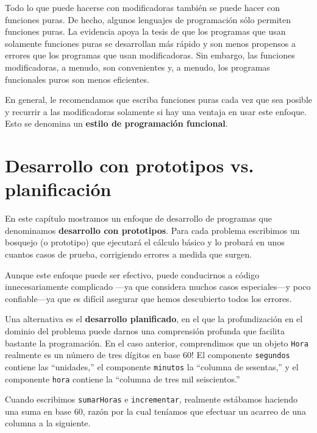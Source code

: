 
Todo lo que puede hacerse con modificadoras también se puede hacer
con funciones puras. De hecho, algunos lenguajes de programación sólo
permiten funciones puras. La evidencia apoya la tesis de que los programas
que usan solamente funciones puras se desarrollan más rápido y son
menos propensos a errores que los programas que usan modificadoras.
Sin embargo, las funciones modificadoras, a menudo, son convenientes
y, a menudo, los programas funcionales puros son menos eficientes.

En general, le recomendamos que escriba funciones puras cada vez que
sea posible y recurrir a las modificadoras solamente si hay una ventaja
en usar este enfoque. Esto se denomina un \textbf{estilo de programación
funcional}.

\section{Desarrollo con prototipos vs. planificación}

\label{convert} 

En este capítulo mostramos un enfoque de desarrollo de programas que
denominamos \textbf{desarrollo con prototipos}. Para cada problema
escribimos un bosquejo (o prototipo) que ejecutará el cálculo básico
y lo probará en unos cuantos casos de prueba, corrigiendo errores
a medida que surgen.

Aunque este enfoque puede ser efectivo, puede conducirnos a código
innecesariamente complicado —ya que considera muchos casos especiales—y
poco confiable—ya que es difícil asegurar que hemos descubierto todos
los errores.

Una alternativa es el \textbf{desarrollo planificado}, en el que la
profundización en el dominio del problema puede darnos una comprensión
profunda que facilita bastante la programación. En el caso anterior,
comprendimos que un objeto \texttt{Hora} realmente es un número de
tres dígitos en base 60! El componente \texttt{segundos} contiene
las ``unidades,'' el componente \texttt{minutos} la ``columna de
sesentas,'' y el componente \texttt{hora} contiene la ``columna
de tres mil seiscientos.''

Cuando escribimos \texttt{sumarHoras} e \texttt{incrementar}, realmente
estábamos haciendo una suma en base 60, razón por la cual teníamos
que efectuar un acarreo de una columna a la siguiente.

